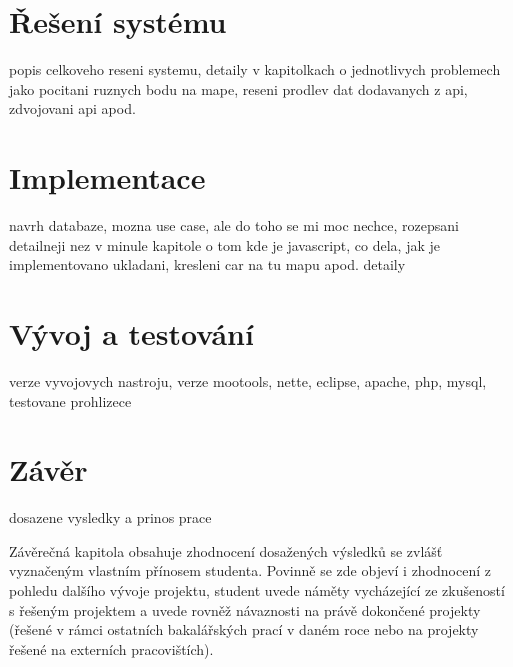 \chapter{Řešení systému}
popis celkoveho reseni systemu, detaily v kapitolkach o jednotlivych
problemech jako pocitani ruznych bodu na mape, reseni prodlev dat
dodavanych z api, zdvojovani api apod.

\chapter{Implementace}
navrh databaze, mozna use case, ale do toho se mi moc nechce,
rozepsani detailneji nez v minule kapitole o tom kde je javascript,
co dela, jak je implementovano ukladani, kresleni car na tu mapu
apod. detaily

\chapter{Vývoj a testování}
verze vyvojovych nastroju, verze mootools, nette, eclipse, apache,
php, mysql, testovane prohlizece

\chapter*{Závěr}
dosazene vysledky a prinos prace

Závěrečná kapitola obsahuje zhodnocení dosažených výsledků se zvlášť
vyznačeným vlastním přínosem studenta. Povinně se zde objeví i
zhodnocení z pohledu dalšího vývoje projektu, student uvede náměty
vycházející ze zkušeností s řešeným projektem a uvede rovněž
návaznosti na právě dokončené projekty (řešené v rámci ostatních
bakalářských prací v daném roce nebo na projekty řešené na externích
pracovištích).
